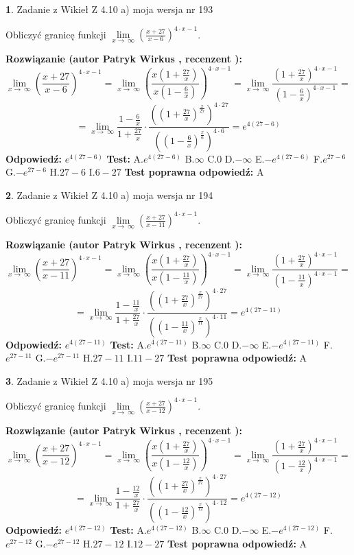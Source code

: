 \documentclass[12pt, a4paper]{article}
\theoremstyle{definition} %
\newtheorem{zad}{}
\newcommand{\zadStart}[1]{\begin{zad}#1\newline}
\newcommand{\zadStop}{\end{zad}}
\newcommand{\rozwStart}[2]{\noindent \textbf{Rozwiązanie (autor #1 , recenzent #2): }\newline}
\newcommand{\rozwStop}{\newline}
\newcommand{\odpStart}{\noindent \textbf{Odpowiedź:}\newline}
\newcommand{\odpStop}{\newline}
\newcommand{\testStart}{\noindent \textbf{Test:}\newline}
\newcommand{\testStop}{\newline}
\newcommand{\kluczStart}{\noindent \textbf{Test poprawna odpowiedź:}\newline}
\newcommand{\kluczStop}{\newline}
\begin{document}
\zadStart{Zadanie z Wikieł Z 4.10 a) moja wersja nr 193}


Obliczyć granicę funkcji  $\lim\limits_{x\to\ \infty}(\frac{x+27}{x-6})^{4\cdot x-1}$.
\zadStop
\rozwStart{Patryk Wirkus}{}
$$\lim\limits_{x\to\ \infty}(\frac{x+27}{x-6})^{4\cdot x-1} = \lim\limits_{x\to\ \infty}(\frac{x(1+\frac{27}{x})}{x(1-\frac{6}{x})})^{4\cdot x-1}=\lim\limits_{x\to\ \infty}\frac{(1+\frac{27}{x})^{4\cdot x-1}}{(1-\frac{6}{x})^{4\cdot x-1}}=$$
$$=\lim\limits_{x\to\ \infty}\frac{1-\frac{6}{x}}{1+\frac{27}{x}}\cdot\frac{((1+\frac{27}{x})^{\frac{x}{27}})^{4\cdot27}}{((1-\frac{6}{x})^{\frac{x}{6}})^{4\cdot6}}=e^{4(27-6)}$$
\rozwStop
\odpStart
$e^{4(27-6)}$
\odpStop
\testStart
A.$e^{4(27-6)}$ B.$\infty$ C.$0$ D.$-\infty$ E.$-e^{4(27-6)}$
F.$e^{27-6}$ G.$-e^{27-6}$
H.$27-6$
I.$6-27$
\testStop
\kluczStart
A
\kluczStop



\zadStart{Zadanie z Wikieł Z 4.10 a) moja wersja nr 194}


Obliczyć granicę funkcji  $\lim\limits_{x\to\ \infty}(\frac{x+27}{x-11})^{4\cdot x-1}$.
\zadStop
\rozwStart{Patryk Wirkus}{}
$$\lim\limits_{x\to\ \infty}(\frac{x+27}{x-11})^{4\cdot x-1} = \lim\limits_{x\to\ \infty}(\frac{x(1+\frac{27}{x})}{x(1-\frac{11}{x})})^{4\cdot x-1}=\lim\limits_{x\to\ \infty}\frac{(1+\frac{27}{x})^{4\cdot x-1}}{(1-\frac{11}{x})^{4\cdot x-1}}=$$
$$=\lim\limits_{x\to\ \infty}\frac{1-\frac{11}{x}}{1+\frac{27}{x}}\cdot\frac{((1+\frac{27}{x})^{\frac{x}{27}})^{4\cdot27}}{((1-\frac{11}{x})^{\frac{x}{11}})^{4\cdot11}}=e^{4(27-11)}$$
\rozwStop
\odpStart
$e^{4(27-11)}$
\odpStop
\testStart
A.$e^{4(27-11)}$ B.$\infty$ C.$0$ D.$-\infty$ E.$-e^{4(27-11)}$
F.$e^{27-11}$ G.$-e^{27-11}$
H.$27-11$
I.$11-27$
\testStop
\kluczStart
A
\kluczStop



\zadStart{Zadanie z Wikieł Z 4.10 a) moja wersja nr 195}


Obliczyć granicę funkcji  $\lim\limits_{x\to\ \infty}(\frac{x+27}{x-12})^{4\cdot x-1}$.
\zadStop
\rozwStart{Patryk Wirkus}{}
$$\lim\limits_{x\to\ \infty}(\frac{x+27}{x-12})^{4\cdot x-1} = \lim\limits_{x\to\ \infty}(\frac{x(1+\frac{27}{x})}{x(1-\frac{12}{x})})^{4\cdot x-1}=\lim\limits_{x\to\ \infty}\frac{(1+\frac{27}{x})^{4\cdot x-1}}{(1-\frac{12}{x})^{4\cdot x-1}}=$$
$$=\lim\limits_{x\to\ \infty}\frac{1-\frac{12}{x}}{1+\frac{27}{x}}\cdot\frac{((1+\frac{27}{x})^{\frac{x}{27}})^{4\cdot27}}{((1-\frac{12}{x})^{\frac{x}{12}})^{4\cdot12}}=e^{4(27-12)}$$
\rozwStop
\odpStart
$e^{4(27-12)}$
\odpStop
\testStart
A.$e^{4(27-12)}$ B.$\infty$ C.$0$ D.$-\infty$ E.$-e^{4(27-12)}$
F.$e^{27-12}$ G.$-e^{27-12}$
H.$27-12$
I.$12-27$
\testStop
\kluczStart
A
\kluczStop
\end{document}
